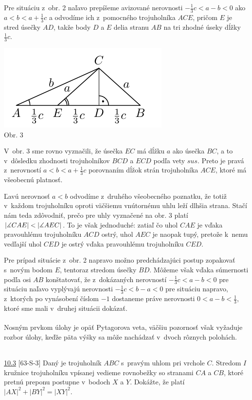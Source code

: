 Pre situáciu z~obr. 2 naľavo prepíšeme avizované nerovnosti $-\frac{1}{3}c < a - b < 0$ ako $a < b < a +\frac{1}{3}c$ a odvodíme ich z~pomocného trojuholníka $ACE$, pričom $E$ je stred úsečky $AD$, takže body $D$ a $E$ delia stranu $AB$ na tri zhodné úseky dĺžky $\frac{1}{3}c$.
\begin{center}
\includegraphics{obrazky/66D32}\\

Obr. 3
\end{center}
V~obr. 3 sme rovno vyznačili, že úsečka $EC$ má dĺžku $a$ ako úsečka $BC$, a to v~dôsledku zhodnosti trojuholníkov $BCD$ a $ECD$ podľa vety $sus$. Preto je pravá z~nerovností $a < b < a +\frac{1}{3}c$ porovnaním dĺžok strán trojuholníka $ACE$, ktoré má všeobecnú platnosť.

Ľavú nerovnosť $a < b$ odvodíme z~druhého všeobecného poznatku, že totiž v~každom trojuholníku oproti väčšiemu vnútornému uhlu leží dlhšia strana. Stačí nám teda zdôvodniť, prečo pre uhly vyznačené na obr. 3 platí $|\measuredangle CAE| < |\measuredangle AEC|$. To je však jednoduché: zatiaľ čo uhol $CAE$ je vďaka pravouhlému trojuholníku $ACD$ ostrý, uhol $AEC$ je naopak tupý, pretože k~nemu vedľajší uhol $CED$ je ostrý vďaka pravouhlému trojuholníku $CED$.

Pre prípad situácie z~obr. 2 napravo možno predchádzajúci postup zopakovať s~novým bodom $E$, tentoraz stredom úsečky $BD$. Môžeme však vďaka súmernosti podľa osi $AB$ konštatovať, že z~dokázaných nerovností $-\frac{1}{3}c < a - b < 0$ pre situáciu naľavo vyplývajú nerovnosti $-\frac{1}{3}c < b - a < 0$ pre situáciu napravo, z~ktorých po vynásobení číslom $-1$ dostaneme práve nerovnosti $0 < a - b <\frac{1}{3}$, ktoré sme mali v~druhej situácii dokázať.\\
\\
\kom Nosným prvkom úlohy je opäť Pytagorova veta, väčšiu pozornosť však vyžaduje rozbor úlohy, keďže päta výšky sa môže nachádzať v~dvoch rôznych polohách.\\
\\
\begin{tcolorbox}[breakable,notitle,boxrule=0pt,colback=light-gray,colframe=light-gray]\ul{10.3} [63-S-3]
Daný je trojuholník $ABC$ s~pravým uhlom pri vrchole $C$. Stredom $I$ kružnice trojuholníku vpísanej vedieme rovnobežky so stranami $CA$ a $CB$, ktoré pretnú preponu postupne v~bodoch $X$ a $Y$. Dokážte, že platí $|AX|^2 + |BY |^2 = |XY |^2$.

\end{tcolorbox}

